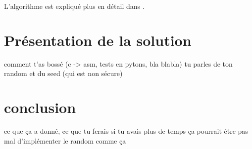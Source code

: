 \documentclass[letterpaper]{article}
\begin{document}
L'algorithme est expliqué plus en détail dans \cite{FernandesMedeiros2012}.

\section{Présentation de la solution}
comment t'as bossé (c -> asm, tests en pytons, bla blabla)
tu parles de ton random et du seed (qui est non sécure)

\section{conclusion}
ce que ça a donné, ce que tu ferais si tu avais plus de temps
ça pourrait être pas mal d'implémenter le random comme ça


\footnotesize


\end{document}
